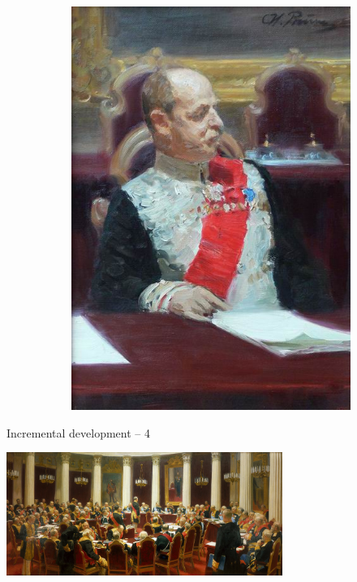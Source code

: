 \documentclass{beamer}
\begin{document}
\begin{frame}
\begin{figure}
\begin{subfigure}{.5\textwidth}
  \includegraphics[width=.8\linewidth]{P2023.AIBCCSS.Drawing/sketch2.jpg}
\end{subfigure}
\end{figure}

\end{frame}


\begin{frame}
{\centerline{Incremental development -- 4}}

\begin{center}
\includegraphics[width=9cm]{P2023.AIBCCSS.Drawing/zasedanie.jpg}
\end{center}

\end{frame}
\end{document}
